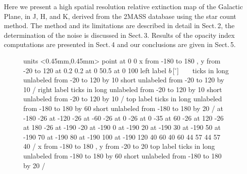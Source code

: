 \documentclass{aa}
\begin{document}
Here we present a high spatial resolution relative extinction map of the
Galactic Plane, in J, H, and K, derived from the 2MASS database using the star
count method. The method and its limitations are described in detail in
Sect.\,2, the determination of the noise is discussed in Sect.\,3. Results of
the opacity index computations are presented in Sect.\,4 and our conclusions
are given in Sect.\,5.     

\begin{figure}[t]
\beginpicture
\setcoordinatesystem units <0.45mm,0.45mm> point at 0 0
\setplotarea x from -180 to 180 , y from -20 to 120
 at 0.2 0.2
 at 0 50.5
 at 0 100
\axis left label {$b$\,[$^\circ$]\,\,\,\,\,\,\,\,\,\,}
ticks in long unlabeled from -20 to 120 by 10
      short unlabeled from -20 to 120 by 10 /
\axis right label {}
ticks in long unlabeled from -20 to 120 by 10
      short unlabeled from -20 to 120 by 10 /
\axis top label {}
ticks in long unlabeled from -180 to 180 by 60
      short unlabeled from -180 to 180 by 20 /
 at -180 -26
 at -120 -26
 at -60 -26
 at 0 -26
 at 0 -35
 at 60 -26
 at 120 -26
 at 180 -26
 at -190 -20
 at -190 0
 at -190 20
 at -190 30
 at -190 50
 at -190 70
 at -190 80
 at -190 100
 at -190 120
 40 60 40 60 44 57 44 57 40 /
\setplotarea x from -180 to 180 , y from -20 to 20
\axis top label {}
ticks in long unlabeled from -180 to 180 by 60
      short unlabeled from -180 to 180 by 20 /

\end{figure}
\end{document}
